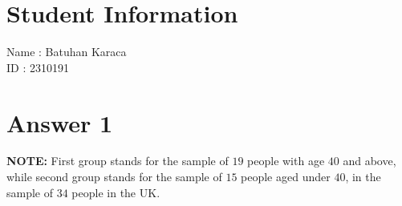 \documentclass[12pt]{article}
\begin{document}
\newcommand{\trilargeMathText}[1]{\mathlarger{\mathlarger{\mathlarger{#1}}}}
\newcommand{\bilargeMathText}[1]{\mathlarger{\mathlarger{#1}}}
\newcommand{\largeexpr}{\frac{(\frac{(0.96)^2}{(19)}+\frac{(1.12)^2}{(15)})^2}{\frac{(0.96)^4}{(19)^2((19)-1)}+\frac{(1.12)^4}{(15)^2((15)-1)}}}


\section*{Student Information}

Name : Batuhan Karaca \\

ID : 2310191 \\

\section*{Answer 1}
\textbf{NOTE:} First group stands for the sample of $19$ people
with age $40$ and above, while second group stands for the
sample of $15$ people aged under $40$, in the sample of  
$34$ people in the UK.
\end{document}
